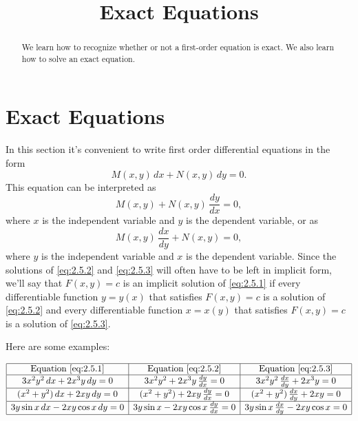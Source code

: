 \documentclass{ximera}
\title{Exact Equations}
\begin{document}
 
\begin{abstract}
We learn how to recognize whether or not a first-order equation is exact.  We also learn how to solve an exact equation.
\end{abstract}
 
\maketitle
 
\section*{Exact Equations}
 
In this section it's convenient to write first order
differential equations in the form
\begin{equation} \label{eq:2.5.1}
M(x,y)\,dx+N(x,y)\,dy=0.
\end{equation}
This equation  can be interpreted as
\begin{equation} \label{eq:2.5.2}
M(x,y)+N(x,y)\,\frac{dy}{dx}=0,
\end{equation}
where $x$ is the independent variable and $y$ is the dependent
variable, or as
\begin{equation} \label{eq:2.5.3}
M(x,y)\,\frac{dx}{dy}+N(x,y)=0,
\end{equation}
where $y$ is the independent variable and $x$ is the dependent
variable. Since the solutions of \eqref{eq:2.5.2} and \eqref{eq:2.5.3} will
often have to be left in
implicit form, we'll say that $F(x,y)=c$ is an implicit solution of
\eqref{eq:2.5.1} if every differentiable function $y=y(x)$ that satisfies
$F(x,y)=c$ is a solution of \eqref{eq:2.5.2} and every
differentiable function $x=x(y)$ that satisfies $F(x,y)=c$ is a
solution of \eqref{eq:2.5.3}.
 
Here are  some examples:
 

$$ 
\begin{array}{|c|c|c|} \hline
\text{Equation }\eqref{eq:2.5.1}&\text{Equation } \eqref{eq:2.5.2}&\text{Equation }\eqref{eq:2.5.3}
\\\hline
3x^2y^2\,dx+2x^3y\,dy =0 & 3x^2y^2+2x^3y\,\frac{dy}{dx} =0  &3x^2y^2\,\frac{dx}{dy}+2x^3y=0
\\\hline
(x^2+y^2)\,dx +2xy\,dy=0 &
(x^2+y^2)+2xy\,\frac{dy}{dx}=0&
(x^2+y^2)\,\frac{dx}{dy} +2xy=0
\\\hline
3y\sin x\,dx-2xy\cos x\,dy =0
&3y\sin x-2xy\cos x\,\frac{dy}{dx} =0
& 3y\sin x\,\frac{dx}{dy}-2xy\cos x  =0
\\\hline
\end{array}
$$
 
\end{document}

